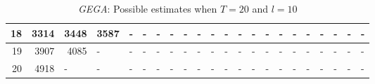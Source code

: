 \begin{appendices}
\begin{table}[H]
\begin{minipage}[b]{18.5cm}
\begin{turn}{90}
{\begin{tabular}{|r|r|r|r|r|r|r|r|r|r|r|r|l|l|l|l|l|l|l|l|l|l|}
18 & 3314 & 3448 & 3587 & \multicolumn{1}{l|}{-} & \multicolumn{1}{l|}{-} & \multicolumn{1}{l|}{-} & \multicolumn{1}{l|}{-} & \multicolumn{1}{l|}{-} & \multicolumn{1}{l|}{-} & \multicolumn{1}{l|}{-} & \multicolumn{1}{l|}{-} & - & - & - & - & - & - & - & - & - & - \\ \hline
19 & 3907 & 4085 & \multicolumn{1}{l|}{-} & \multicolumn{1}{l|}{-} & \multicolumn{1}{l|}{-} & \multicolumn{1}{l|}{-} & \multicolumn{1}{l|}{-} & \multicolumn{1}{l|}{-} & \multicolumn{1}{l|}{-} & \multicolumn{1}{l|}{-} & \multicolumn{1}{l|}{-} & - & - & - & - & - & - & - & - & - & - \\ \hline
20 & 4918 & \multicolumn{1}{l|}{-} & \multicolumn{1}{l|}{-} & \multicolumn{1}{l|}{-} & \multicolumn{1}{l|}{-} & \multicolumn{1}{l|}{-} & \multicolumn{1}{l|}{-} & \multicolumn{1}{l|}{-} & \multicolumn{1}{l|}{-} & \multicolumn{1}{l|}{-} & \multicolumn{1}{l|}{-} & - & - & - & - & - & - & - & - & - & - \\ \hline
\end{tabular}
}
\end{turn}
\caption{\emph{GEGA}: Possible estimates when $T=20$ and $l=10$}
 \end{minipage}
 \end{table}



\end{appendices}
